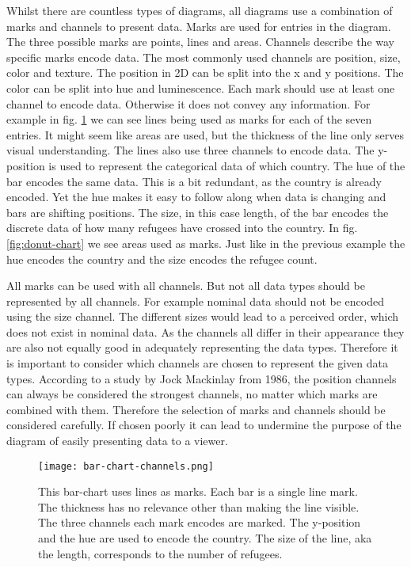 Whilst there are countless types of diagrams, all diagrams use a combination of marks and channels to present data. Marks are used for entries in the diagram. The three possible marks are points, lines and areas. Channels describe the way specific marks encode data. The most commonly used channels are position, size, color and texture. The position in 2D can be split into the x and y positions. The color can be split into hue and luminescence. Each mark should use at least one channel to encode data. Otherwise it does not convey any information. For example in fig. \ref{fig:bar-chart} we can see lines being used as marks for each of the seven entries. It might seem like areas are used, but the thickness of the line only serves visual understanding. The lines also use three channels to encode data. The y-position is used to represent the categorical data of which country. The hue of the bar encodes the same data. This is a bit redundant, as the country is already encoded. Yet the hue makes it easy to follow along when data is changing and bars are shifting positions. The size, in this case length, of the bar encodes the discrete data of how many refugees have crossed into the country. In fig. \ref{fig:donut-chart} we see areas used as marks. Just like in the previous example the hue encodes the country and the size encodes the refugee count. 

All marks can be used with all channels. But not all data types should be represented by all channels. For example nominal data should not be encoded using the size channel. The different sizes would lead to a perceived order, which does not exist in nominal data. As the channels all differ in their appearance they are also not equally good in adequately representing the data types. Therefore it is important to consider which channels are chosen to represent the given data types.  According to a study by Jock Mackinlay from 1986, the position channels can always be considered the strongest channels, no matter which marks are combined with them\cite{mackinlay1986automating}. Therefore the selection of marks and channels should be considered carefully. If chosen poorly it can lead to undermine the purpose of the diagram of easily presenting data to a viewer.


\begin{figure}
    \texttt{[image: bar-chart-channels.png]}
    \captionsetup{width=0.9\textwidth}
    \caption[bar-chart]{This bar-chart uses lines as marks. Each bar is a single line mark. The thickness has no relevance other than making the line visible. The three channels each mark encodes are marked. The y-position and the hue are used to encode the country. The size of the line, aka the length, corresponds to the number of refugees.}
    \label{fig:bar-chart}
\end{figure}

